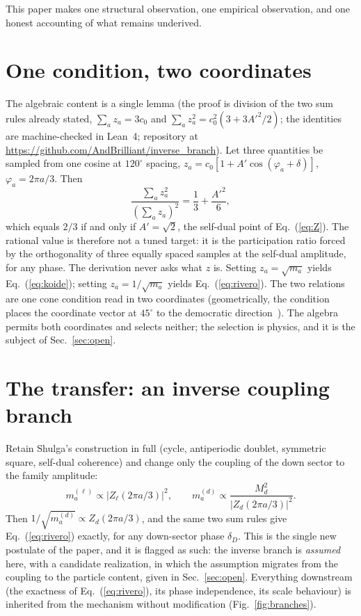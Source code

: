\documentclass[11pt]{article}
\begin{document}
This paper makes one structural observation, one empirical observation, and one
honest accounting of what remains underived.

\section{One condition, two coordinates}

The algebraic content is a single lemma (the proof is division of the two sum
rules already stated, $\sum_a z_a = 3c_0$ and $\sum_a z_a^2 = c_0^2(3+3A'^2/2)$;
the identities are machine-checked in Lean~4; repository at \url{https://github.com/AndBrilliant/inverse_branch}). Let three quantities be sampled from one cosine
at $120^\circ$ spacing, $z_a = c_0[1+A'\cos(\varphi_a+\delta)]$,
$\varphi_a = 2\pi a/3$. Then
\begin{equation}
\frac{\sum_a z_a^2}{\left(\sum_a z_a\right)^2} = \frac{1}{3}+\frac{A'^2}{6},
\end{equation}
which equals $2/3$ if and only if $A' = \sqrt{2}$, the self-dual point of Eq.~(\ref{eq:Z}). The rational value is therefore not a tuned target: it is the participation ratio forced by the orthogonality of three equally spaced samples at the self-dual amplitude, for any phase. The derivation never asks what $z$ is. Setting $z_a = \sqrt{m_a}$
yields Eq.~(\ref{eq:koide}); setting $z_a = 1/\sqrt{m_a}$ yields
Eq.~(\ref{eq:rivero}). The two relations are one cone condition read in two coordinates (geometrically, the condition places the coordinate vector at $45^\circ$ to the democratic direction~\cite{Foot}). The algebra permits both coordinates and selects neither; the
selection is physics, and it is the subject of Sec.~\ref{sec:open}.

\section{The transfer: an inverse coupling branch}
\label{sec:transfer}

Retain Shulga's construction in full (cycle, antiperiodic doublet, symmetric square, self-dual coherence) and change only the coupling of the down sector to
the family amplitude:
\begin{equation}
m_a^{(\ell)} \propto |Z_\ell(2\pi a/3)|^2,
\qquad
m_a^{(d)} \propto \frac{M_d^2}{|Z_d(2\pi a/3)|^2}.
\label{eq:branches}
\end{equation}
Then $1/\sqrt{m_a^{(d)}} \propto Z_d(2\pi a/3)$, and the same two sum rules give
Eq.~(\ref{eq:rivero}) exactly, for any down-sector phase $\delta_D$. This is the single new postulate of the paper, and it is flagged as such: the inverse branch is \emph{assumed} here, with a candidate realization, in which the assumption migrates from the coupling to the particle content, given in Sec.~\ref{sec:open}. Everything downstream (the exactness of Eq.~(\ref{eq:rivero}), its phase independence, its scale behaviour) is
inherited from the mechanism without modification (Fig.~\ref{fig:branches}).
\end{document}
